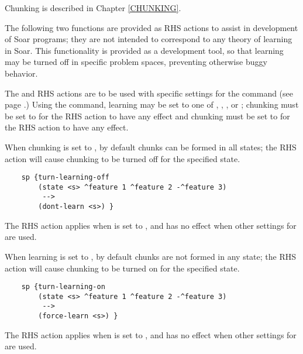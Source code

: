 

Chunking is described in Chapter \ref{CHUNKING}.

The following two functions are provided as RHS actions to assist in development of Soar programs; they are not intended to correspond to any theory of learning in Soar. This functionality is provided as a development tool, so that learning may be turned off in specific problem spaces, preventing otherwise buggy behavior.

The  and  RHS actions are to be used with specific settings for the  command (see page \pageref{chunk}.) Using the  command, learning may be set to one of , , , or ; chunking must be set to  for the  RHS action to have any effect and chunking must be set to  for the  RHS action to have any effect.

\begin{description}

\item [\soarb{dont-learn} --- ]
	When chunking is set to , by default chunks can be formed in all states; the  RHS action will cause chunking to be turned off for the specified state.

	\begin{verbatim}
	sp {turn-learning-off
	    (state <s> ^feature 1 ^feature 2 -^feature 3)
	     -->
	    (dont-learn <s>) }
	\end{verbatim}

	The  RHS action applies when  is set to , and has no effect when other settings for  are used.


\item [\soarb{force-learn} --- ]
	When learning is set to , by default chunks are not formed in any state; the  RHS action will cause chunking to be turned on for the specified state.

	\begin{verbatim}
	sp {turn-learning-on
	    (state <s> ^feature 1 ^feature 2 -^feature 3)
	     -->
	    (force-learn <s>) }
	\end{verbatim}

	The  RHS action applies when  is set to , and has no effect when other settings for  are used.

\end{description}

